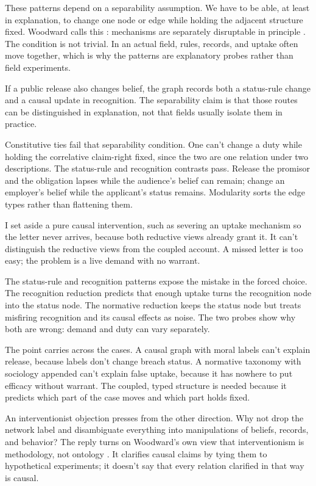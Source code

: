 \documentclass[12pt]{article}
\begin{document}
These patterns depend on a separability assumption. We have to be able, at least in explanation, to change one node or edge while holding the adjacent structure fixed. Woodward calls this : mechanisms are separately disruptable in principle \citep{woodward2003MakingThingsHappen}. The condition is not trivial. In an actual field, rules, records, and uptake often move together, which is why the patterns are explanatory probes rather than field experiments.

If a public release also changes belief, the graph records both a status-rule change and a causal update in recognition. The separability claim is that those routes can be distinguished in explanation, not that fields usually isolate them in practice.

Constitutive ties fail that separability condition. One can't change a duty while holding the correlative claim-right fixed, since the two are one relation under two descriptions. The status-rule and recognition contrasts pass. Release the promisor and the obligation lapses while the audience's belief can remain; change an employer's belief while the applicant's status remains. Modularity sorts the edge types rather than flattening them.

I set aside a pure causal intervention, such as severing an uptake mechanism so the letter never arrives, because both reductive views already grant it. It can't distinguish the reductive views from the coupled account. A missed letter is too easy; the problem is a live demand with no warrant.

The status-rule and recognition patterns expose the mistake in the forced choice. The recognition reduction predicts that enough uptake turns the recognition node into the status node. The normative reduction keeps the status node but treats misfiring recognition and its causal effects as noise. The two probes show why both are wrong: demand and duty can vary separately.

The point carries across the cases. A causal graph with moral labels can't explain release, because labels don't change breach status. A normative taxonomy with sociology appended can't explain false uptake, because it has nowhere to put efficacy without warrant. The coupled, typed structure is needed because it predicts which part of the case moves and which part holds fixed.

An interventionist objection presses from the other direction. Why not drop the network label and disambiguate everything into manipulations of beliefs, records, and behavior? The reply turns on Woodward's own view that interventionism is methodology, not ontology \citep{woodward2014MethodologyOntology}. It clarifies causal claims by tying them to hypothetical experiments; it doesn't say that every relation clarified in that way is causal.
\end{document}
